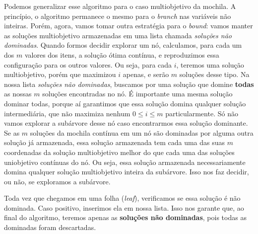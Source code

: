 Podemos generalizar esse algoritmo para o caso multiobjetivo da mochila. A princípio, o algoritmo permanece o mesmo para o \textit{branch} nas variáveis não inteiras. Porém, agora, vamos tomar outra estratégia para o \textit{bound}: vamos manter as soluções multiobjetivo armazenadas em uma lista chamada \textit{soluções não dominadas}. Quando formos decidir explorar um nó, calculamos, para cada um dos $m$ valores dos itens, a solução ótima contínua, e reproduzimos essa configuração para os outros valores. Ou seja, para cada $i$, teremos uma solução multiobjetivo, porém que maximizou $i$ apenas, e serão $m$ soluções desse tipo. Na nossa lista \textit{soluções não dominadas}, buscamos por uma solução que domine \textbf{todas} as nossas $m$ soluções encontradas no nó. É importante uma mesma solução dominar todas, porque aí garantimos que essa solução domina qualquer solução intermediária, que não maximiza nenhum $0 \le i \le m$ particularmente. Só não vamos explorar a subárvore desse nó caso encontrarmos essa solução dominante. Se as $m$ soluções da mochila contínua em um nó são dominadas por alguma outra solução já armazenada, essa solução armazenada tem cada uma das suas $m$ coordenadas da solução multiobjetivo melhor do que cada uma das soluções uniobjetivo contínuas do nó. Ou seja, essa solução armazenada necessariamente domina qualquer solução multiobjetivo inteira da subárvore. Isso nos faz decidir, ou não, se exploramos a subárvore.

Toda vez que chegamos em uma folha (\textit{leaf}), verificamos se essa solução é não dominada. Caso positivo, inserimos ela em nossa lista. Isso nos garante que, ao final do algoritmo, teremos apenas as \textbf{soluções não dominadas}, pois todas as dominadas foram descartadas.
